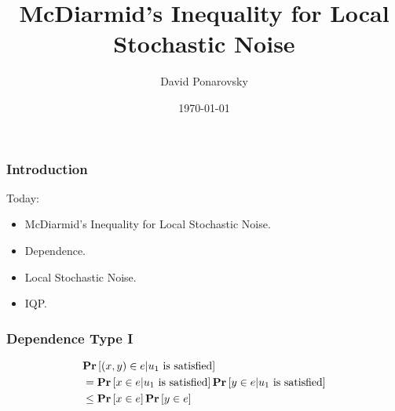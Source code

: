 \documentclass{beamer}
\begin{document}
 



\begin{frame}
  \title{McDiarmid's Inequality for Local Stochastic Noise} 
    \author{David Ponarovsky}
    \date{\today}
    \titlepage
\end{frame}


\begin{frame}

\frametitle{Introduction}
\begin{block}{Today:}
\begin{itemize}
  \item McDiarmid's Inequality for Local Stochastic Noise.
  \item Dependence. 
  \item Local Stochastic Noise.  
  \item IQP.
\end{itemize}
\end{block}
\end{frame}

  


\begin{frame}
  \frametitle{Dependence Type I}
  \begin{figure}[h]
  \end{figure}

  \begin{align*}
    & \mathbf{Pr} \left[  (x,y) \in e | u_{1} \text{ is satisfied}  \right]  \\
    & = \mathbf{Pr} \left[  x \in e | u_{1} \text{ is satisfied}   \right]  \mathbf{Pr} \left[  y \in e | u_{1} \text{ is satisfied}   \right] \\ 
    & \le \mathbf{Pr} \left[  x \in e  \right]\mathbf{Pr} \left[  y \in e  \right]
  \end{align*}

\end{frame}
\end{document}
